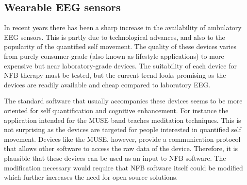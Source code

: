 \subsection{Wearable EEG sensors} %
In recent years there has been a sharp increase in the availability of ambulatory EEG sensors. This is partly due to technological advances, and also to the popularity of the quantified self movement. The quality of these devices varies from purely consumer-grade (also known as lifestyle applications) to more expensive but near laboratory-grade devices. The suitability of each device for NFB therapy must be tested, but the current trend looks promising as the devices are readily available and cheap compared to laboratory EEG. 

The standard software that usually accompanies these devices seems to be more oriented for self quantification and cognitive enhancement. For instance the application intended for the MUSE band teaches meditation techniques. This is not surprising as the devices are targeted for people interested in quantified self movement. Devices like the MUSE, however, provide a communication protocol that allows other software to access the raw data of the device. Therefore, it is plausible that these devices can be used as an input to NFB software. The modification necessary would require that NFB software itself could be modified which further increases the need for open source solutions.
